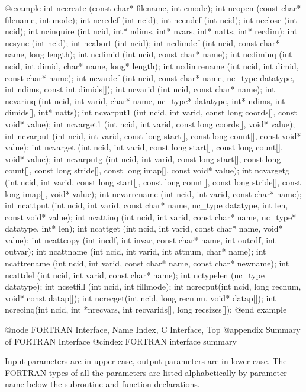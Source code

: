 {@example
int nccreate (const char* filename, int cmode);
int ncopen (const char* filename, int mode);
int ncredef (int ncid);
int ncendef (int ncid);
int ncclose (int ncid);
int ncinquire (int ncid, int* ndims, int* nvars, int* natts, int* recdim);
int ncsync (int ncid);
int ncabort (int ncid);
int ncdimdef (int ncid, const char* name, long length);
int ncdimid (int ncid, const char* name);
int ncdiminq (int ncid, int dimid, char* name, long* length);
int ncdimrename (int ncid, int dimid, const char* name);
int ncvardef (int ncid, const char* name, nc_type datatype, int ndims,
              const int dimids[]);
int ncvarid (int ncid, const char* name);
int ncvarinq (int ncid, int varid, char* name, nc_type* datatype, int* ndims,
              int dimids[], int* natts);
int ncvarput1 (int ncid, int varid, const long coords[], const void* value);
int ncvarget1 (int ncid, int varid, const long coords[], void* value);
int ncvarput (int ncid, int varid, const long start[], const long count[],
              const void* value);
int ncvarget (int ncid, int varid, const long start[], const long count[],
              void* value);
int ncvarputg (int ncid, int varid, const long start[], const long count[],
              const long stride[], const long imap[], const void* value);
int ncvargetg (int ncid, int varid, const long start[], const long count[],
              const long stride[], const long imap[], void* value);
int ncvarrename (int ncid, int varid, const char* name);
int ncattput (int ncid, int varid, const char* name, nc_type datatype, int len,
              const void* value);
int ncattinq (int ncid, int varid, const char* name, nc_type* datatype,
              int* len);
int ncattget (int ncid, int varid, const char* name, void* value);
int ncattcopy (int incdf, int invar, const char* name, int outcdf, int outvar);
int ncattname (int ncid, int varid, int attnum, char* name);
int ncattrename (int ncid, int varid, const char* name, const char* newname);
int ncattdel (int ncid, int varid, const char* name);
int nctypelen (nc_type datatype);
int ncsetfill (int ncid, int fillmode);
int ncrecput(int ncid, long recnum, void* const datap[]);
int ncrecget(int ncid, long recnum, void* datap[]);
int ncrecinq(int ncid, int *nrecvars, int recvarids[], long recsizes[]);
@end example

@node FORTRAN Interface, Name Index, C Interface, Top
@appendix Summary of FORTRAN Interface
@cindex FORTRAN interface summary

Input parameters are in upper case, output parameters are in lower case.
The FORTRAN types of all the parameters are listed alphabetically by
parameter name below the subroutine and function declarations.

}
